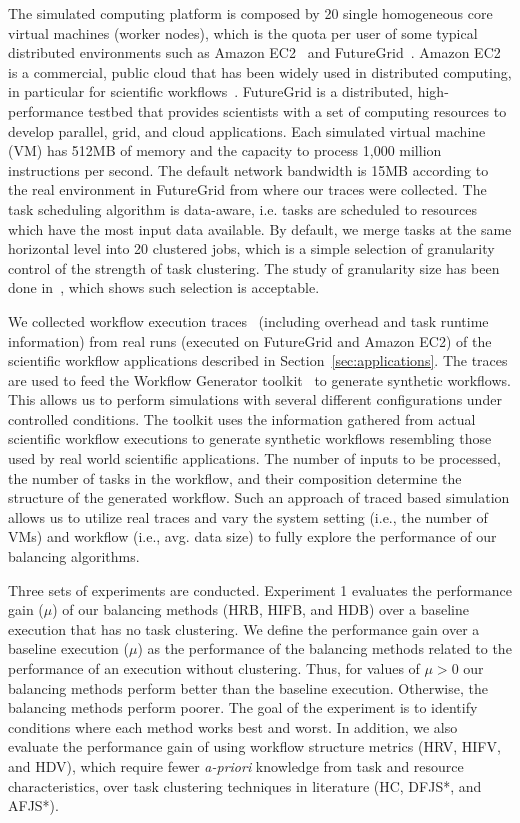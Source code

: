 The simulated computing platform is composed by 20 single homogeneous core virtual machines (worker nodes), which is the quota per user of some typical distributed environments such as Amazon EC2~\cite{AmazonAWS} and FutureGrid~\cite{FutureGrid}. Amazon EC2 is a commercial, public cloud that has been widely used in distributed computing, in particular for scientific workflows~\cite{Juve09scientificworkflow}. FutureGrid is a distributed, high-performance testbed that provides scientists with a set of computing resources to develop parallel, grid, and cloud applications. Each simulated virtual machine (VM) has 512MB of memory and the capacity to process 1,000 million instructions per second. The default network bandwidth is 15MB according to the real environment in FutureGrid from where our traces were collected. The task scheduling algorithm is data-aware, i.e. tasks are scheduled to resources which have the most input data available. By default, we merge tasks at the same horizontal level into 20 clustered jobs, which is a simple selection of granularity control of the strength of task clustering. The study of granularity size has been done in~\cite{6683907}, which shows such selection is acceptable. 

We collected workflow execution traces~\cite{Juve2013,Chen2011} (including overhead and task runtime information) from real runs (executed on FutureGrid and Amazon EC2) of the scientific workflow applications described in Section~\ref{sec:applications}. The traces are used to feed the Workflow Generator toolkit~\cite{WorkflowGenerator} to generate synthetic workflows. This allows us to perform simulations with several different configurations under controlled conditions. The toolkit uses the information gathered from actual scientific workflow executions to generate synthetic workflows resembling those used by real world scientific applications. The number of inputs to be processed, the number of tasks in the workflow, and their composition determine the structure of the generated workflow. Such an approach of traced based simulation allows us to utilize real traces and vary the system setting (i.e., the number of VMs) and workflow (i.e., avg. data size) to fully explore the performance of our balancing algorithms. 

Three sets of experiments are conducted. Experiment 1 evaluates the performance gain ($\mu$) of our balancing methods (HRB, HIFB, and HDB) over a baseline execution that has no task clustering. We define the performance gain over a baseline execution ($\mu$) as the performance of the balancing methods related to the performance of an execution without clustering. Thus, for values of $\mu > 0$ our balancing methods perform better than the baseline execution. Otherwise, the balancing methods perform poorer. The goal of the experiment is to identify conditions where each method works best and worst. In addition, we also evaluate the performance gain of using workflow structure metrics (HRV, HIFV, and HDV), which require fewer \emph{a-priori} knowledge from task and resource characteristics, over task clustering techniques in literature (HC, DFJS*, and AFJS*).

